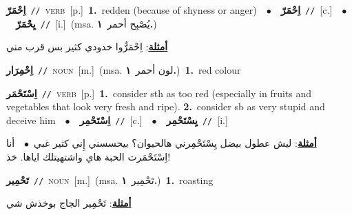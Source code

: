 \documentclass[10pt,a4paper,twoside]{article} %
\begin{document}
\begin{multicols}{2}
{\setlength\topsep{0pt}\textbf{\foreignlanguage{arabic}{اِحْمَرّ}}\ {\color{gray}\texttt{//}\color{black}}\ \textsc{verb}\ [p.]\ \textbf{1.}~redden (because of shyness or anger)\ \ $\bullet$\ \ \setlength\topsep{0pt}\textbf{\foreignlanguage{arabic}{اِحْمَرّ}}\ {\color{gray}\texttt{//}\color{black}}\ [c.]\ \ $\bullet$\ \ \setlength\topsep{0pt}\textbf{\foreignlanguage{arabic}{يِحْمَرّ}}\ {\color{gray}\texttt{//}\color{black}}\ [i.]\ \color{gray}(msa. \foreignlanguage{arabic}{يُصْبِح أحمر}~\foreignlanguage{arabic}{\textbf{١.}})\color{black}\  \begin{flushright}\color{gray}\foreignlanguage{arabic}{\textbf{\underline{\foreignlanguage{arabic}{أمثلة}}}: اِحْمَرُّوا خدودي كثير بس قرب مني}\end{flushright}\color{black}} \vspace{2mm}

{\setlength\topsep{0pt}\textbf{\foreignlanguage{arabic}{اِحْمِرَار}}\ {\color{gray}\texttt{//}\color{black}}\ \textsc{noun}\ [m.]\ \color{gray}(msa. \foreignlanguage{arabic}{لون أحمر}~\foreignlanguage{arabic}{\textbf{١.}})\color{black}\ \textbf{1.}~red colour\ } \vspace{2mm}

{\setlength\topsep{0pt}\textbf{\foreignlanguage{arabic}{اِسْتَحْمَر}}\ {\color{gray}\texttt{//}\color{black}}\ \textsc{verb}\ [p.]\ \textbf{1.}~consider sth as too red (especially in fruits and vegetables that look very fresh and ripe).  \textbf{2.}~consider sb as very stupid and deceive him\ \ $\bullet$\ \ \setlength\topsep{0pt}\textbf{\foreignlanguage{arabic}{اِسْتَحْمِر}}\ {\color{gray}\texttt{//}\color{black}}\ [c.]\ \ $\bullet$\ \ \setlength\topsep{0pt}\textbf{\foreignlanguage{arabic}{يِسْتَحْمِر}}\ {\color{gray}\texttt{//}\color{black}}\ [i.]\  \begin{flushright}\color{gray}\foreignlanguage{arabic}{\textbf{\underline{\foreignlanguage{arabic}{أمثلة}}}: ليش عطول بيضل يِسْتَحْمِرني هالحيوان؟ بيحسسني إِني كثير غبي\ $\bullet$\ \  أنا اِسْتَحْمَرت الحبة هاي واشتهيتلك اياها. خذ!}\end{flushright}\color{black}} \vspace{2mm}

{\setlength\topsep{0pt}\textbf{\foreignlanguage{arabic}{تَحْمِير}}\ {\color{gray}\texttt{//}\color{black}}\ \textsc{noun}\ [m.]\ \color{gray}(msa. \foreignlanguage{arabic}{تَحْمِير}~\foreignlanguage{arabic}{\textbf{١.}})\color{black}\ \textbf{1.}~roasting\  \begin{flushright}\color{gray}\foreignlanguage{arabic}{\textbf{\underline{\foreignlanguage{arabic}{أمثلة}}}: تَحْمِير الجاج بوخذش شي}\end{flushright}\color{black}} \vspace{2mm}


\end{multicols}
\end{document}
